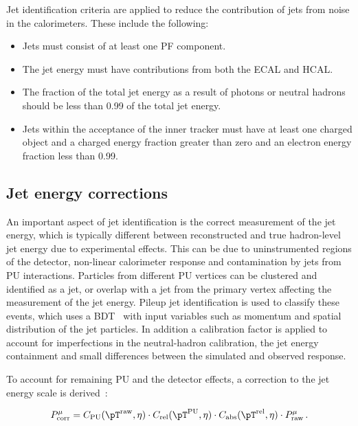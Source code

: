 Jet identification criteria are applied to reduce the contribution of jets from
noise in the calorimeters. These include the following:
\begin{itemize}
\item Jets must consist of at least one \ac{PF} component. 
\item The jet energy must have contributions
from both the \ac{ECAL} and \ac{HCAL}.
\item The fraction of the total jet energy as a result of photons or neutral
hadrons should be less than 0.99 of the total jet energy.
\item Jets within the acceptance of the inner tracker must have at least one
charged object and a charged energy fraction greater than zero and an electron
energy fraction less than 0.99. 
\end{itemize}

\subsection{Jet energy corrections}
\label{sec:JEC}

An important aspect of jet identification is the correct measurement of the jet
energy, which is typically different between reconstructed and true hadron-level jet energy
due to experimental effects. This can be due to uninstrumented regions of the
detector, non-linear calorimeter response and contamination by jets from \ac{PU}
interactions. Particles from different \ac{PU} vertices can be clustered and identified as a
jet, or overlap with a jet from the primary vertex affecting the measurement of the jet energy.
Pileup jet identification \cite{CMS-PAS-JME-13-005} is used to classify these events, which uses a 
\ac{BDT}~\cite{TMVA} with input variables such as
momentum and spatial distribution of the jet particles. In addition
a calibration factor is applied to account for imperfections in the
neutral-hadron calibration, the jet energy containment and small differences
between the simulated and observed response.

To account for remaining \ac{PU} and the detector effects, a correction to the jet energy
scale is derived~\cite{CMS-JME-10-011}:


\begin{equation}
P_{\text{corr}}^{\mu} = C_{\text{PU}}(\pT^{\text{raw}},\eta) \cdot
C_{\text{rel}}(\pT^{\text{PU}},\eta) \cdot C_{\text{abs}}(\pT^{\text{rel}},\eta) \cdot
P_{\text{raw}}^{\mu}\, .
\end{equation}


